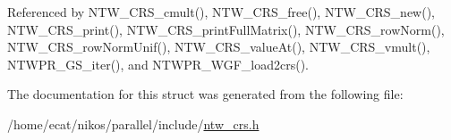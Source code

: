 Referenced by N\+T\+W\+\_\+\+C\+R\+S\+\_\+cmult(), N\+T\+W\+\_\+\+C\+R\+S\+\_\+free(), N\+T\+W\+\_\+\+C\+R\+S\+\_\+new(), N\+T\+W\+\_\+\+C\+R\+S\+\_\+print(), N\+T\+W\+\_\+\+C\+R\+S\+\_\+print\+Full\+Matrix(), N\+T\+W\+\_\+\+C\+R\+S\+\_\+row\+Norm(), N\+T\+W\+\_\+\+C\+R\+S\+\_\+row\+Norm\+Unif(), N\+T\+W\+\_\+\+C\+R\+S\+\_\+value\+At(), N\+T\+W\+\_\+\+C\+R\+S\+\_\+vmult(), N\+T\+W\+P\+R\+\_\+\+G\+S\+\_\+iter(), and N\+T\+W\+P\+R\+\_\+\+W\+G\+F\+\_\+load2crs().



The documentation for this struct was generated from the following file\+:\begin{DoxyCompactItemize}
\item 
/home/ecat/nikos/parallel/include/\mbox{\hyperlink{ntw__crs_8h}{ntw\+\_\+crs.\+h}}\end{DoxyCompactItemize}
